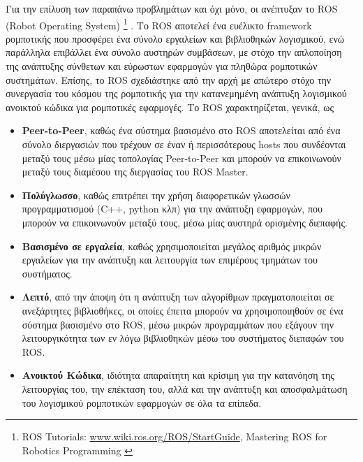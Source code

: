 \bigskip
Για την επίλυση των παραπάνω προβλημάτων και όχι μόνο, οι \citeauthor{ros} \cite{ros} ανέπτυξαν το ROS (Robot Operating System) \footnote{ROS Tutorials: \url{www.wiki.ros.org/ROS/StartGuide}, Mastering ROS for Robotics Programming \cite{mastering_ros}} . Το ROS αποτελεί ένα ευέλικτο framework ρομποτικής που προσφέρει ένα σύνολο εργαλείων και βιβλιοθηκών λογισμικού, ενώ παράλληλα επιβάλλει ένα σύνολο αυστηρών συμβάσεων, με στόχο την απλοποίηση της ανάπτυξης σύνθετων και εύρωστων εφαρμογών για πληθώρα ρομποτικών συστημάτων. Επίσης, το ROS σχεδιάστηκε από την αρχή με απώτερο στόχο την συνεργασία του κόσμου της ρομποτικής για την κατανεμημένη ανάπτυξη λογισμικού ανοικτού κώδικα για ρομποτικές εφαρμογές. Το ROS χαρακτηρίζεται, γενικά, ως
\begin{itemize}
	\item \textbf{Peer-to-Peer}, καθώς ένα σύστημα βασισμένο στο ROS αποτελείται από ένα σύνολο διεργασιών που τρέχουν σε έναν ή περισσότερους hosts που συνδέονται μεταξύ τους μέσω μίας τοπολογίας Peer-to-Peer και μπορούν να επικοινωνούν μεταξύ τους διαμέσου της διεργασίας του ROS Master.
	\item \textbf{Πολύγλωσσο}, καθώς επιτρέπει την χρήση διαφορετικών γλωσσών προγραμματισμού (C++, python κλπ) για την ανάπτυξη εφαρμογών, που μπορούν να επικοινωνούν μεταξύ τους, μέσω μίας αυστηρά ορισμένης διεπαφής.
	\item \textbf{Βασισμένο σε εργαλεία}, καθώς χρησιμοποιείται μεγάλος αριθμός μικρών εργαλείων για την ανάπτυξη και λειτουργία των επιμέρους τμημάτων του συστήματος.
	\item \textbf{Λεπτό}, από την άποψη ότι η ανάπτυξη των αλγορίθμων πραγματοποιείται σε ανεξάρτητες βιβλιοθήκες, οι οποίες έπειτα μπορούν να χρησιμοποιηθούν σε ένα σύστημα βασισμένο στο ROS, μέσω μικρών προγραμμάτων που εξάγουν την λειτουργικότητα των εν λόγω βιβλιοθηκών μέσω του συστήματος διεπαφών του ROS.
	\item \textbf{Ανοικτού Κώδικα}, ιδιότητα απαραίτητη και κρίσιμη για την κατανόηση της λειτουργίας του, την επέκταση του, αλλά και την ανάπτυξη και αποσφαλμάτωση του λογισμικού ρομποτικών εφαρμογών σε όλα τα επίπεδα.
\end{itemize}

